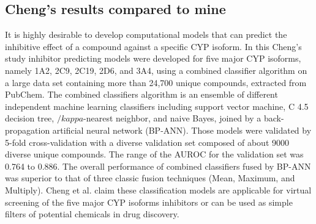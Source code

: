 

\subsection{Cheng's results compared to mine}
It is highly desirable to develop computational models that can predict the inhibitive effect of a compound against a specific CYP isoform. In this Cheng's study inhibitor predicting models were developed for five major CYP isoforms, namely 1A2, 2C9, 2C19, 2D6, and 3A4, using a combined classifier algorithm on a large data set containing more than 24,700 unique compounds, extracted from PubChem. The combined classifiers algorithm is an ensemble of different independent machine learning classifiers including support vector machine, C 4.5 decision tree, $/kappa$-nearest neighbor, and naive Bayes, joined by a back-propagation artificial neural network (BP-ANN). Those models were validated by 5-fold cross-validation with a diverse validation set composed of about 9000 diverse unique compounds. The range of the AUROC for the validation set was 0.764 to 0.886. The overall performance of combined classifiers fused by BP-ANN was superior to that of three classic fusion techniques (Mean, Maximum, and Multiply). Cheng et al. claim these classification models are applicable for virtual screening of the five major CYP isoforms inhibitors or can be used as simple filters of potential chemicals in drug discovery.\cite{Cheng2011}